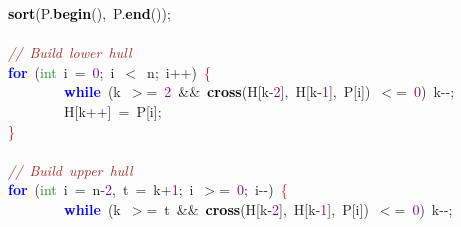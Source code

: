 {{\mbox{}\ \ \ \ \ \ \ \ \textbf{\textcolor{Black}{sort}}\textcolor{BrickRed}{(}P\textcolor{BrickRed}{.}\textbf{\textcolor{Black}{begin}}\textcolor{BrickRed}{(),}\ P\textcolor{BrickRed}{.}\textbf{\textcolor{Black}{end}}\textcolor{BrickRed}{());} \\
\mbox{}\  \\
\mbox{}\ \ \ \ \ \ \ \ \textit{\textcolor{Brown}{//\ Build\ lower\ hull}} \\
\mbox{}\ \ \ \ \ \ \ \ \textbf{\textcolor{Blue}{for}}\ \textcolor{BrickRed}{(}\textcolor{ForestGreen}{int}\ i\ \textcolor{BrickRed}{=}\ \textcolor{Purple}{0}\textcolor{BrickRed}{;}\ i\ \textcolor{BrickRed}{$<$}\ n\textcolor{BrickRed}{;}\ i\textcolor{BrickRed}{++)}\ \textcolor{Red}{\{} \\
\mbox{}\ \ \ \ \ \ \ \ \ \ \ \ \ \ \ \ \textbf{\textcolor{Blue}{while}}\ \textcolor{BrickRed}{(}k\ \textcolor{BrickRed}{$>$=}\ \textcolor{Purple}{2}\ \textcolor{BrickRed}{\&\&}\ \textbf{\textcolor{Black}{cross}}\textcolor{BrickRed}{(}H\textcolor{BrickRed}{[}k\textcolor{BrickRed}{-}\textcolor{Purple}{2}\textcolor{BrickRed}{],}\ H\textcolor{BrickRed}{[}k\textcolor{BrickRed}{-}\textcolor{Purple}{1}\textcolor{BrickRed}{],}\ P\textcolor{BrickRed}{[}i\textcolor{BrickRed}{])}\ \textcolor{BrickRed}{$<$=}\ \textcolor{Purple}{0}\textcolor{BrickRed}{)}\ k\textcolor{BrickRed}{-\/-;} \\
\mbox{}\ \ \ \ \ \ \ \ \ \ \ \ \ \ \ \ H\textcolor{BrickRed}{[}k\textcolor{BrickRed}{++]}\ \textcolor{BrickRed}{=}\ P\textcolor{BrickRed}{[}i\textcolor{BrickRed}{];} \\
\mbox{}\ \ \ \ \ \ \ \ \textcolor{Red}{\}} \\
\mbox{}\  \\
\mbox{}\ \ \ \ \ \ \ \ \textit{\textcolor{Brown}{//\ Build\ upper\ hull}} \\
\mbox{}\ \ \ \ \ \ \ \ \textbf{\textcolor{Blue}{for}}\ \textcolor{BrickRed}{(}\textcolor{ForestGreen}{int}\ i\ \textcolor{BrickRed}{=}\ n\textcolor{BrickRed}{-}\textcolor{Purple}{2}\textcolor{BrickRed}{,}\ t\ \textcolor{BrickRed}{=}\ k\textcolor{BrickRed}{+}\textcolor{Purple}{1}\textcolor{BrickRed}{;}\ i\ \textcolor{BrickRed}{$>$=}\ \textcolor{Purple}{0}\textcolor{BrickRed}{;}\ i\textcolor{BrickRed}{-\/-)}\ \textcolor{Red}{\{} \\
\mbox{}\ \ \ \ \ \ \ \ \ \ \ \ \ \ \ \ \textbf{\textcolor{Blue}{while}}\ \textcolor{BrickRed}{(}k\ \textcolor{BrickRed}{$>$=}\ t\ \textcolor{BrickRed}{\&\&}\ \textbf{\textcolor{Black}{cross}}\textcolor{BrickRed}{(}H\textcolor{BrickRed}{[}k\textcolor{BrickRed}{-}\textcolor{Purple}{2}\textcolor{BrickRed}{],}\ H\textcolor{BrickRed}{[}k\textcolor{BrickRed}{-}\textcolor{Purple}{1}\textcolor{BrickRed}{],}\ P\textcolor{BrickRed}{[}i\textcolor{BrickRed}{])}\ \textcolor{BrickRed}{$<$=}\ \textcolor{Purple}{0}\textcolor{BrickRed}{)}\ k\textcolor{BrickRed}{-\/-;} \\
}}
